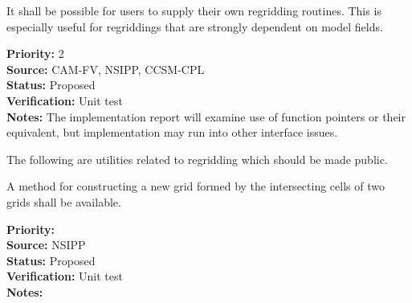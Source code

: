 
It shall be possible for users to supply their own regridding
routines.  This is especially useful for regriddings that are
strongly dependent on model fields.

\begin{reqlist}
{\bf Priority:} 2 \\
{\bf Source:}  CAM-FV, NSIPP, CCSM-CPL \\
{\bf Status:} Proposed \\
{\bf Verification:} Unit test \\
{\bf Notes:} The implementation report will examine use of
             function pointers or their equivalent, but implementation
             may run into other interface issues.

\end{reqlist}


The following are utilities related to regridding which should be made
public.


A method for constructing a new grid formed by the intersecting
cells of two grids shall be available.

\begin{reqlist}
{\bf Priority:}  \\
{\bf Source:}  NSIPP \\
{\bf Status:} Proposed \\
{\bf Verification:} Unit test \\
{\bf Notes:} 
\end{reqlist}

